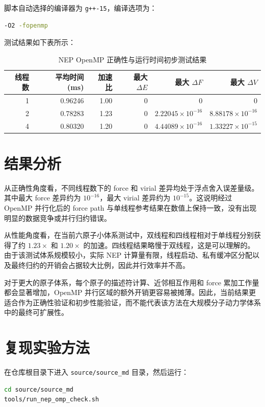 \documentclass[11pt]{article}
\begin{document}
脚本自动选择的编译器为 \texttt{g++-15}，编译选项为：

\begin{lstlisting}[language=bash]
-O2 -fopenmp
\end{lstlisting}

测试结果如下表所示：

\begin{table}[h]
\centering
\begin{tabular}{@{}rrrrrr@{}}
\toprule
线程数 & 平均时间 (ms) & 加速比 & 最大 $\Delta E$ & 最大 $\Delta F$ & 最大 $\Delta V$ \\
\midrule
1 & 0.96246 & 1.00 & 0 & 0 & 0 \\
2 & 0.78283 & 1.23 & 0 & $2.22045\times10^{-16}$ & $8.88178\times10^{-16}$ \\
4 & 0.80320 & 1.20 & 0 & $4.44089\times10^{-16}$ & $1.33227\times10^{-15}$ \\
\bottomrule
\end{tabular}
\caption{NEP OpenMP 正确性与运行时间初步测试结果}
\end{table}

\section{结果分析}

从正确性角度看，不同线程数下的 force 和 virial 差异均处于浮点舍入误差量级。其中最大 force 差异约为 $10^{-16}$，最大 virial 差异约为 $10^{-15}$。这说明经过 OpenMP 并行化后的 force path 与单线程参考结果在数值上保持一致，没有出现明显的数据竞争或并行归约错误。

从性能角度看，在当前六原子小体系测试中，双线程和四线程相对于单线程分别获得了约 $1.23\times$ 和 $1.20\times$ 的加速。四线程结果略慢于双线程，这是可以理解的。由于该测试体系规模较小，实际 NEP 计算量有限，线程启动、私有缓冲区分配以及最终归约的开销会占据较大比例，因此并行效率并不高。

对于更大的原子体系，每个原子的描述符计算、近邻相互作用和 force 累加工作量都会显著增加，OpenMP 并行区域的额外开销更容易被摊薄。因此，当前结果更适合作为正确性验证和初步性能验证，而不能代表该方法在大规模分子动力学体系中的最终可扩展性。

\section{复现实验方法}

在仓库根目录下进入 \texttt{source/source\_md} 目录，然后运行：

\begin{lstlisting}[language=bash]
cd source/source_md
tools/run_nep_omp_check.sh
\end{lstlisting}
\end{document}
